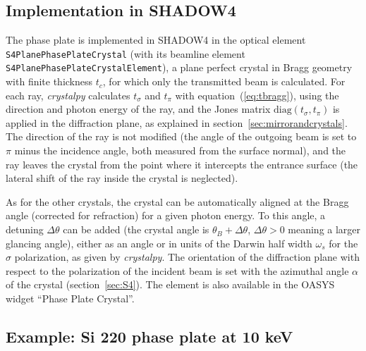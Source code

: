 \documentclass{iucr}
\begin{document}
\subsection{Implementation in SHADOW4}

The phase plate is implemented in SHADOW4 in the optical element {\tt S4PlanePhasePlateCrystal} (with its beamline element {\tt S4PlanePhasePlateCrystalElement}), a plane perfect crystal in Bragg geometry with finite thickness $t_c$, for which only the transmitted beam is calculated. For each ray, {\it crystalpy} calculates $t_\sigma$ and $t_\pi$ with equation~(\ref{eq:tbragg}), using the direction and photon energy of the ray, and the Jones matrix $\mathrm{diag}(t_\sigma,t_\pi)$ is applied in the diffraction plane, as explained in section~\ref{sec:mirrorandcrystals}. The direction of the ray is not modified (the angle of the outgoing beam is set to $\pi$ minus the incidence angle, both measured from the surface normal), and the ray leaves the crystal from the point where it intercepts the entrance surface (the lateral shift of the ray inside the crystal is neglected).

As for the other crystals, the crystal can be automatically aligned at the Bragg angle (corrected for refraction) for a given photon energy. To this angle, a detuning $\Delta\theta$ can be added (the crystal angle is $\theta_B+\Delta\theta$, $\Delta\theta>0$ meaning a larger glancing angle), either as an angle or in units of the Darwin half width $\omega_s$ for the $\sigma$ polarization, as given by {\it crystalpy}. The orientation of the diffraction plane with respect to the polarization of the incident beam is set with the azimuthal angle $\alpha$ of the crystal (section~\ref{sec:S4}). The element is also available in the OASYS widget ``Phase Plate Crystal''.

\subsection{Example: Si 220 phase plate at 10 keV}
\end{document}
